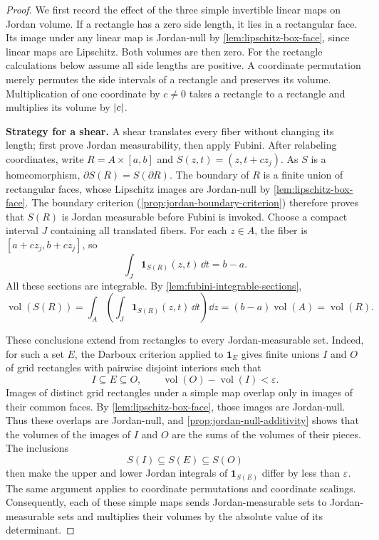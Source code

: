 \begin{proof}
We first record the effect of the three simple invertible linear maps on
Jordan volume. If a rectangle has a zero side length, it lies in a
rectangular face. Its image under any linear map is Jordan-null by
\cref{lem:lipschitz-box-face}, since linear maps are Lipschitz. Both
volumes are then zero. For the rectangle calculations below assume all
side lengths are positive. A coordinate permutation merely permutes the side intervals
of a rectangle and preserves its volume.  Multiplication of one coordinate
by \(c\ne0\) takes a rectangle to a rectangle and multiplies its volume by
\(\lvert c\rvert\).

\textbf{Strategy for a shear.} A shear translates every fiber without
changing its length; first prove Jordan measurability, then apply Fubini.
After relabeling coordinates, write $R=A\times[a,b]$ and
$S(z,t)=(z,t+cz_j)$. As $S$ is a homeomorphism,
$\partial S(R)=S(\partial R)$. The boundary of $R$ is a finite union
of rectangular faces, whose Lipschitz images are Jordan-null by
\cref{lem:lipschitz-box-face}. The boundary criterion
(\cref{prop:jordan-boundary-criterion}) therefore proves that $S(R)$
is Jordan measurable before Fubini is invoked.
Choose a compact interval $J$ containing all translated fibers.
For each $z\in A$, the fiber is $[a+cz_j,b+cz_j]$, so
\[
\int_J\mathbf1_{S(R)}(z,t)\,\dd t=b-a.
\]
All these sections are integrable. By \cref{lem:fubini-integrable-sections},
\[
\operatorname{vol}(S(R))
=\int_A\left(\int_J\mathbf1_{S(R)}(z,t)\,\dd t\right)\dd z
=(b-a)\operatorname{vol}(A)=\operatorname{vol}(R).
\]

These conclusions extend from rectangles to every Jordan-measurable set.
Indeed, for such a set \(E\), the Darboux criterion applied to
\(\mathbf1_E\) gives finite unions \(I\) and \(O\) of grid rectangles with
pairwise disjoint interiors such that
\[
I\subseteq E\subseteq O,
\qquad
\operatorname{vol}(O)-\operatorname{vol}(I)<\varepsilon.
\]
Images of distinct grid rectangles under a simple map overlap only in
images of their common faces. By \cref{lem:lipschitz-box-face},
those images are Jordan-null.
Thus these overlaps are Jordan-null, and
\cref{prop:jordan-null-additivity} shows that the volumes of the images of
\(I\) and \(O\) are the sums of the volumes of their pieces.  The inclusions
\[
S(I)\subseteq S(E)\subseteq S(O)
\]
then make the upper and lower Jordan integrals of \(\mathbf1_{S(E)}\) differ
by less than \(\varepsilon\).  The same argument applies to coordinate
permutations and coordinate scalings.  Consequently, each of these simple maps
sends Jordan-measurable sets to Jordan-measurable sets and multiplies their
volumes by the absolute value of its determinant.


\end{proof}
